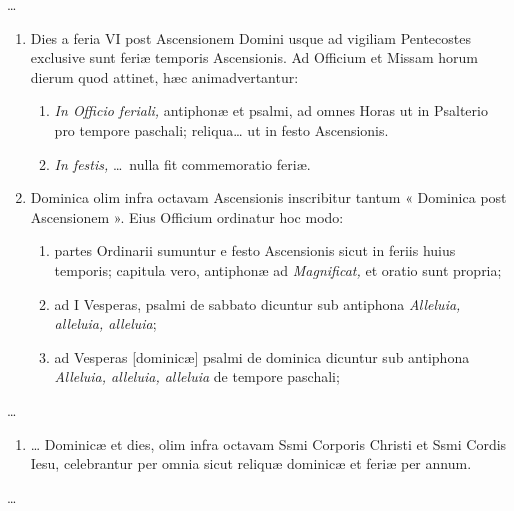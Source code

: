\documentclass[vesperale_romanum.tex]{subfiles}
\begin{document}
…

\begin{enumerate}[nosep,start=29]
\item Dies a feria VI post Ascensionem Domini usque ad vigiliam Pentecostes exclusive sunt feriæ temporis Ascensionis. Ad Officium et Missam horum dierum quod attinet, hæc animadvertantur:
\begin{enumerate}[nosep,label=\alph*.]
\item \textit{In Officio feriali,} antiphonæ et psalmi, ad omnes Horas ut in Psalterio pro tempore paschali; reliqua… ut in festo Ascensionis.
 \item \textit{In festis,} … nulla fit commemoratio feriæ.
 \end{enumerate}
 
 \item Dominica olim infra octavam Ascensionis inscribitur tantum « Dominica post Ascensionem ». Eius Officium ordinatur hoc modo:
 \begin{enumerate}[nosep,label=\alph*.]
\item partes Ordinarii sumuntur e festo Ascensionis sicut in feriis huius temporis; capitula vero, antiphonæ ad \textit{Magnificat,} et oratio sunt propria;
\item ad I Vesperas, psalmi de sabbato dicuntur sub antiphona \textit{Alleluia, alleluia, alleluia};
\item ad Vesperas [dominicæ] psalmi de dominica dicuntur sub antiphona \textit{Alleluia, alleluia, alleluia} de tempore paschali;
\end{enumerate}\end{enumerate}

…

\begin{enumerate}[nosep,start=33]
\item … Dominicæ et dies, olim infra octavam Ssmi Corporis Christi et Ssmi Cordis Iesu, celebrantur per omnia sicut reliquæ dominicæ et feriæ per annum.
\end{enumerate}

…
\end{document}
